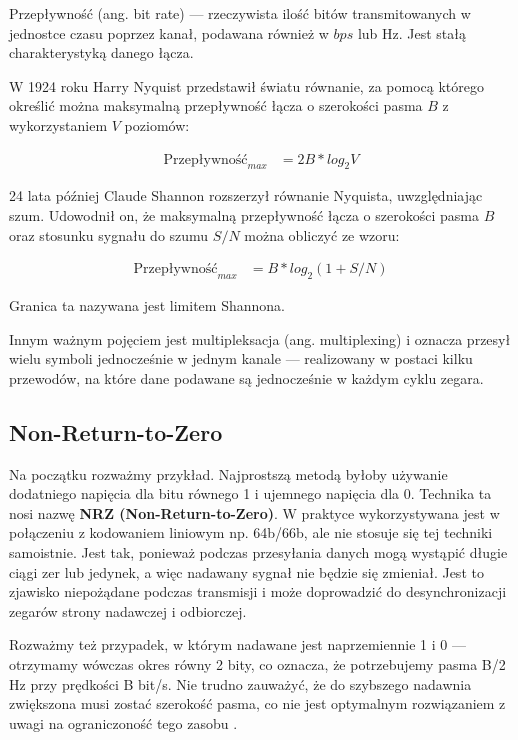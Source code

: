 Przepływność (ang. bit rate) --- rzeczywista ilość bitów transmitowanych w jednostce czasu poprzez kanał, podawana również w $bps$ lub Hz. Jest stałą charakterystyką danego łącza.

W 1924 roku Harry Nyquist przedstawił światu równanie, za pomocą którego określić można maksymalną przepływność łącza o szerokości pasma $B$ z wykorzystaniem $V$ poziomów:

\begin{align*}
    \text{Przepływność}_{max} &= 2B * log_{2}{V}
\end{align*}

24 lata później Claude Shannon rozszerzył równanie Nyquista, uwzględniając szum. Udowodnił on, że maksymalną przepływność łącza o szerokości pasma $B$ oraz stosunku sygnału do szumu $S/N$ można
obliczyć ze wzoru:

\begin{align*}
    \text{Przepływność}_{max} &= B * log_{2}{(1 + S/N)}
\end{align*}

Granica ta nazywana jest limitem Shannona.

Innym ważnym pojęciem jest multipleksacja (ang. multiplexing) i oznacza przesył wielu symboli jednocześnie w jednym kanale --- realizowany w postaci kilku przewodów, na które dane podawane są jednocześnie w każdym cyklu zegara.

\subsection{Non-Return-to-Zero}

Na początku rozważmy przykład. Najprostszą metodą byłoby używanie dodatniego napięcia dla bitu równego 1 i ujemnego napięcia dla 0.
Technika ta nosi nazwę \textbf{NRZ (Non-Return-to-Zero)}.
W praktyce wykorzystywana jest w połączeniu z kodowaniem liniowym np. 64b/66b, ale nie stosuje się tej techniki samoistnie.
Jest tak, ponieważ podczas przesyłania danych mogą wystąpić długie ciągi zer lub jedynek, a więc nadawany sygnał nie będzie się zmieniał.
Jest to zjawisko niepożądane podczas transmisji i może doprowadzić do desynchronizacji zegarów strony nadawczej i odbiorczej.

Rozważmy też przypadek, w którym nadawane jest naprzemiennie 1 i 0 --- otrzymamy wówczas okres równy 2 bity, co oznacza, że potrzebujemy pasma B/2 Hz przy prędkości B bit/s.
Nie trudno zauważyć, że do szybszego nadawnia zwiększona musi zostać szerokość pasma, co nie jest optymalnym rozwiązaniem z uwagi na ograniczoność tego zasobu \cite{Computer-networks-Tanenbaum}.

